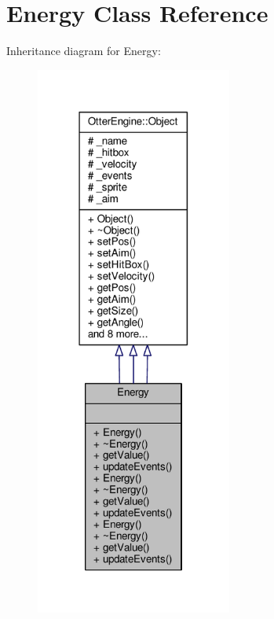\hypertarget{class_energy}{}\section{Energy Class Reference}
\label{class_energy}


Inheritance diagram for Energy\+:\nopagebreak
\begin{figure}[H]
\begin{center}
\leavevmode
\includegraphics[width=183pt]{d9/d7c/class_energy__inherit__graph}
\end{center}
\end{figure}


